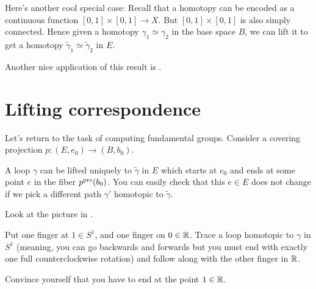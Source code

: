 \begin{remark}
	Here's another cool special case:
	Recall that a homotopy can be encoded as a continuous function $[0,1] \times [0,1] \to X$.
	But $[0,1] \times [0,1]$ is also simply connected.
	Hence given a homotopy $\gamma_1 \simeq \gamma_2$ in the base space $B$, we can lift it to get
	a homotopy $\tilde\gamma_1 \simeq \tilde\gamma_2$ in $E$.
\end{remark}
Another nice application of this result is .

\section{Lifting correspondence}
Let's return to the task of computing fundamental groups.
Consider a covering projection $p \colon (E, e_0) \to (B, b_0)$.

A loop $\gamma$ can be lifted uniquely to $\tilde\gamma$ in $E$
which starts at $e_0$ and ends at some point $e$ in the fiber $p^{\text{pre}}(b_0)$.
You can easily check that this $e \in E$ does not change if we
pick a different path $\gamma'$ homotopic to $\tilde\gamma$.
\begin{ques}
	Look at the picture in .

	Put one finger at $1 \in S^1$, and one finger on $0 \in \mathbb R$.
	Trace a loop homotopic to $\gamma$ in $S^1$ (meaning, you can
	go backwards and forwards but you must end with exactly one full
	counterclockwise rotation)
	and follow along with the other finger in $\mathbb R$.

	Convince yourself that you have to end at the point $1 \in \mathbb R$.
\end{ques}

